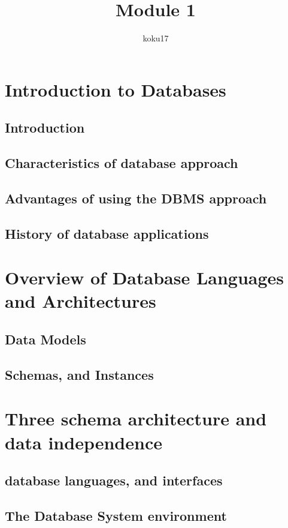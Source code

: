 \documentclass{article}
\title{Module 1}
\author{koku17}
\begin{document}
	\maketitle \thispagestyle{empty} \newpage
	\tableofcontents \thispagestyle{empty} \newpage
	\section{Introduction to Databases}
	\subsection{Introduction}
	\subsection{Characteristics of database approach}
	\subsection{Advantages of using the DBMS approach}
	\subsection{History of database applications}

	\section{Overview of Database Languages and Architectures}
	\subsection{Data Models}
	\subsection{Schemas, and Instances}

	\section{Three schema architecture and data independence}
	\subsection{database languages, and interfaces}
	\subsection{The Database System environment}
\end{document}
